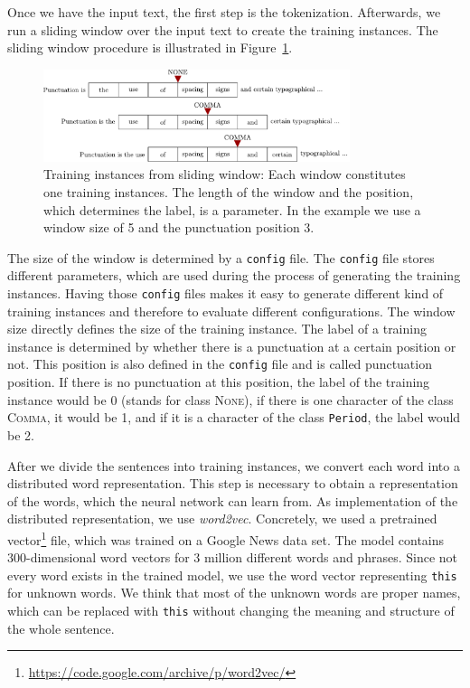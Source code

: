 Once we have the input text, the first step is the tokenization.
Afterwards, we run a sliding window over the input text to create the training instances.
The sliding window procedure is illustrated in Figure~\ref{fig:sliding_window}.
\begin{figure}[ht]
    \centering
    \includegraphics[width=0.8\textwidth]{img/sliding_window.pdf}
    \caption{Training instances from sliding window: Each window constitutes one training instances. The length of the window and the position, which determines the label, is a parameter. In the example we use a window size of 5 and the punctuation position 3.}
    \label{fig:sliding_window}
\end{figure}
The size of the window is determined by a \texttt{config} file.
The \texttt{config} file stores different parameters, which are used during the process of generating the training instances.
Having those \texttt{config} files makes it easy to generate different kind of training instances and therefore to evaluate different configurations.
The window size directly defines the size of the training instance.
The label of a training instance is determined by whether there is a punctuation at a certain position or not.
This position is also defined in the \texttt{config} file and is called punctuation position.
If there is no punctuation at this position, the label of the training instance would be 0 (stands for class \textsc{None}), if there is one character of the class \textsc{Comma}, it would be 1, and if it is a character of the class \texttt{Period}, the label would be 2.

After we divide the sentences into training instances, we convert each word into a distributed word representation.
This step is necessary to obtain a representation of the words, which the neural network can learn from.
As implementation of the distributed representation, we use \emph{word2vec}\cite{Mikolov1, Mikolov2, Mikolov3}. %
Concretely, we used a pretrained vector\footnote{\url{https://code.google.com/archive/p/word2vec/}} file, which was trained on a Google News data set.
The model contains 300-dimensional word vectors for 3 million different words and phrases.
Since not every word exists in the trained model, we use the word vector representing \texttt{this} for unknown words.
We think that most of the unknown words are proper names, which can be replaced with \texttt{this} without changing the meaning and structure of the whole sentence.

